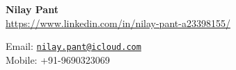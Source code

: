 \noindent
\begin{minipage}[t]{0.5\textwidth}
    \textbf{Nilay Pant}\\
    \href{https://www.linkedin.com/in/nilay-pant-a23398155/}{https://www.linkedin.com/in/nilay-pant-a23398155/}
\end{minipage}%
\begin{minipage}[t]{0.5\textwidth}
    \raggedleft
    Email: \href{mailto:nilay.pant@icloud.com}{\nolinkurl{nilay.pant@icloud.com}}\\
    Mobile: +91-9690323069
\end{minipage}
\\
\\
